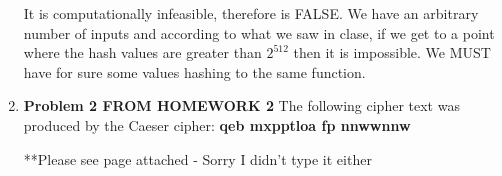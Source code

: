 \documentclass[12pt]{article}
\begin{document}
\begin{enumerate}
	It is computationally infeasible, therefore is FALSE. We have an arbitrary number of inputs and according to what we saw in clase, if we get to a point where the hash values are greater than $2^{512}$ then it is impossible. We MUST have for sure some values hashing to the same function.  
	
	\vspace{10pt}
	
	\item {\textbf{Problem 2 FROM HOMEWORK 2} The following cipher text was produced by the Caeser cipher:  \textbf{qeb mxpptloa fp nnwwnnw}}
	
	**Please see page attached - Sorry I didn't type it either

    
\end{enumerate}
\end{document}
